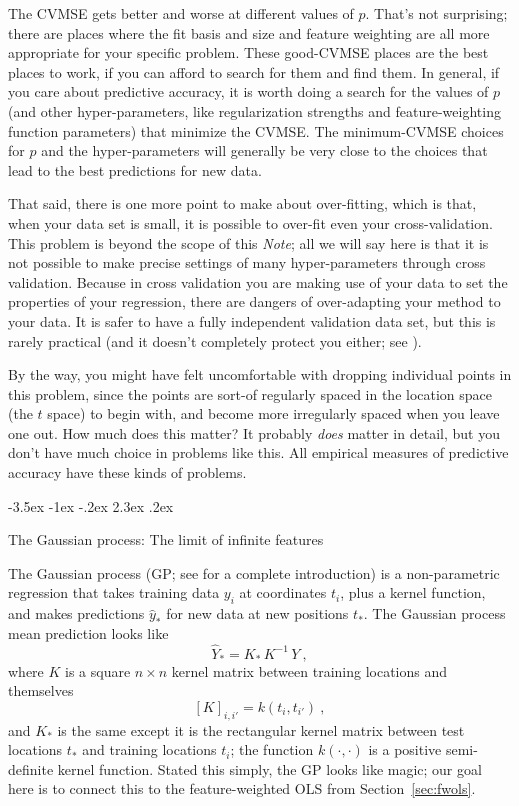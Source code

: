 \documentclass[12pt,letterpaper]{article}
\makeatletter
\renewcommand\section{\@startsection {section}{1}{\z@}%
  {-3.5ex \@plus -1ex \@minus -.2ex}%
  {2.3ex \@plus.2ex}%
  {\raggedright\normalfont\Large\bfseries}}
\newcommand{\documentname}{\textsl{Note}}
\newcommand{\sectionname}{Section}
\makeatother
\begin{document}
The CVMSE gets better and worse at different values of $p$.
That's not surprising; there are places where the fit basis and size and feature weighting are all more appropriate for your specific problem.
These good-CVMSE places are the best places to work, if you can afford to search for them and find them.
In general, if you care about predictive accuracy, it is worth doing a search for the values of $p$ (and other hyper-parameters, like regularization strengths and feature-weighting function parameters) that minimize the CVMSE.
The minimum-CVMSE choices for $p$ and the hyper-parameters will generally be very close to the choices that lead to the best predictions for new data.

That said, there is one more point to make about over-fitting, which is that, when your data set is small, it is possible to over-fit even your cross-validation.
This problem is beyond the scope of this \documentname; all we will say here is that it is not possible to make precise settings of many hyper-parameters through cross validation.
Because in cross validation you are making use of your data to set the properties of your regression, there are dangers of over-adapting your method to your data.
It is safer to have a fully independent validation data set, but this is rarely practical (and it doesn't completely protect you either; see \citealt{cifar10}).

By the way, you might have felt uncomfortable with dropping individual points in this problem, since the points are sort-of regularly spaced in the location space (the $t$ space) to begin with, and become more irregularly spaced when you leave one out.
How much does this matter?
It probably \emph{does} matter in detail, but you don't have much choice in problems like this.
All empirical measures of predictive accuracy have these kinds of problems.

\section{The Gaussian process: The limit of infinite features}\label{sec:gp}

The Gaussian process (GP; see \citealt{gpml} for a complete introduction) is a non-parametric regression that takes training data $y_i$ at coordinates $t_i$, plus a kernel function, and makes predictions $\hat{y}_\ast$ for new data at new positions $t_\ast$.
The Gaussian process mean prediction looks like%
\begin{equation}\label{eq:gpmean}
    \hat{Y}_\ast = K_\ast\,K^{-1}\,Y
    ~,
\end{equation}
where $K$ is a square $n\times n$ kernel matrix between training locations and themselves
\begin{equation}\label{eq:Kmatrix}
    [K]_{i,i'} = k(t_i,t_{i'})
    ~,
\end{equation}
and $K_\ast$ is the same except it is the rectangular kernel matrix between test locations $t_\ast$ and training locations $t_i$;
the function $k(\cdot,\cdot)$ is a positive semi-definite kernel function.
Stated this simply, the GP looks like magic; our goal here is to connect this to the feature-weighted OLS from \sectionname~\ref{sec:fwols}.
\end{document}

